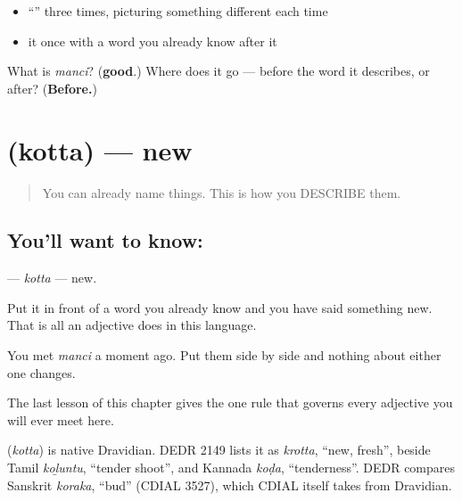 \begin{itemize}
\raggedright
  \item \textquotedblleft{}\textquotedblright{} three times, picturing something different each time
  \item it once with a word you already know after it
\end{itemize}

\begin{tcolorbox}[breakable,colback=teal!4,colframe=teal!35!black,title={Before you move on}]
What is \emph{manci}? (\textbf{good}.) Where does it go — before the word it describes, or after? (\textbf{Before.})
\end{tcolorbox}
\section[\texorpdfstring{\te{కొత్త} (kotta)}{కొత్త (kotta)}]{ (kotta) — new}

\label{lesson:TE-C42-new}



\begin{quote}
You can already name things. This is how you DESCRIBE them.
\end{quote}

\subsection*{You'll want to know: }
\textbf{} — \emph{kotta} — new.

Put it in front of a word you already know and you have said something new. That is all an adjective does in this language.

You met \textbf{} \emph{manci} a moment ago. Put them side by side and nothing about either one changes.

The last lesson of this chapter gives the one rule that governs every adjective you will ever meet here.

\begin{cousinweb}
\textbf{} (\emph{kotta}) is native Dravidian. DEDR 2149 lists it as \emph{krotta}, \textquotedblleft{}new, fresh\textquotedblright{}, beside Tamil \emph{koḻuntu}, \textquotedblleft{}tender shoot\textquotedblright{}, and Kannada \emph{koḍa}, \textquotedblleft{}tenderness\textquotedblright{}. DEDR compares Sanskrit \emph{koraka}, \textquotedblleft{}bud\textquotedblright{} (CDIAL 3527), which CDIAL itself takes from Dravidian.
\end{cousinweb}

